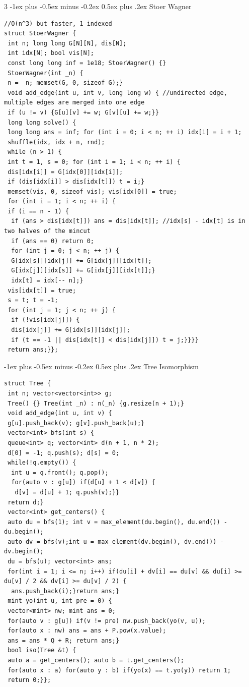 \documentclass[8pt,a4paper,onesided]{article}
\makeatletter
\renewcommand{\subsection}{\@startsection{subsection}{2}{0mm}
    {-1ex plus -0.5ex minus -0.2ex} %
    {0.5ex plus .2ex}                %
    {\normalfont\large\bfseries}}    %
\makeatother
\begin{document}
\begin{multicols}{3}
\subsection{Stoer Wagner}
\begin{verbatim}
//O(n^3) but faster, 1 indexed
struct StoerWagner {
 int n; long long G[N][N], dis[N];
 int idx[N]; bool vis[N];
 const long long inf = 1e18; StoerWagner() {}
 StoerWagner(int _n) {
 n = _n; memset(G, 0, sizeof G);}
 void add_edge(int u, int v, long long w) { //undirected edge, multiple edges are merged into one edge
 if (u != v) {G[u][v] += w; G[v][u] += w;}}
 long long solve() {
 long long ans = inf; for (int i = 0; i < n; ++ i) idx[i] = i + 1;
 shuffle(idx, idx + n, rnd);
 while (n > 1) {
 int t = 1, s = 0; for (int i = 1; i < n; ++ i) {
 dis[idx[i]] = G[idx[0]][idx[i]];
 if (dis[idx[i]] > dis[idx[t]]) t = i;}
 memset(vis, 0, sizeof vis); vis[idx[0]] = true;
 for (int i = 1; i < n; ++ i) {
 if (i == n - 1) {
  if (ans > dis[idx[t]]) ans = dis[idx[t]]; //idx[s] - idx[t] is in two halves of the mincut
  if (ans == 0) return 0;
  for (int j = 0; j < n; ++ j) {
  G[idx[s]][idx[j]] += G[idx[j]][idx[t]];
  G[idx[j]][idx[s]] += G[idx[j]][idx[t]];}
  idx[t] = idx[-- n];}
 vis[idx[t]] = true;
 s = t; t = -1;
 for (int j = 1; j < n; ++ j) {
  if (!vis[idx[j]]) {
  dis[idx[j]] += G[idx[s]][idx[j]];
  if (t == -1 || dis[idx[t]] < dis[idx[j]]) t = j;}}}}
 return ans;}};
\end{verbatim}
\subsection{Tree Isomorphism}
\begin{verbatim}
struct Tree {
 int n; vector<vector<int>> g;
 Tree() {} Tree(int _n) : n(_n) {g.resize(n + 1);}
 void add_edge(int u, int v) {
 g[u].push_back(v); g[v].push_back(u);}
 vector<int> bfs(int s) {
 queue<int> q; vector<int> d(n + 1, n * 2);
 d[0] = -1; q.push(s); d[s] = 0;
 while(!q.empty()) {
  int u = q.front(); q.pop();
  for(auto v : g[u]) if(d[u] + 1 < d[v]) {
   d[v] = d[u] + 1; q.push(v);}}
 return d;}
 vector<int> get_centers() {
 auto du = bfs(1); int v = max_element(du.begin(), du.end()) - du.begin();
 auto dv = bfs(v);int u = max_element(dv.begin(), dv.end()) - dv.begin();
 du = bfs(u); vector<int> ans;
 for(int i = 1; i <= n; i++) if(du[i] + dv[i] == du[v] && du[i] >= du[v] / 2 && dv[i] >= du[v] / 2) {
  ans.push_back(i);}return ans;}
 mint yo(int u, int pre = 0) {
 vector<mint> nw; mint ans = 0;
 for(auto v : g[u]) if(v != pre) nw.push_back(yo(v, u));
 for(auto x : nw) ans = ans + P.pow(x.value);
 ans = ans * Q + R; return ans;}
 bool iso(Tree &t) {
 auto a = get_centers(); auto b = t.get_centers();
 for(auto x : a) for(auto y : b) if(yo(x) == t.yo(y)) return 1;
 return 0;}};
\end{verbatim}

\end{multicols}
\end{document}
